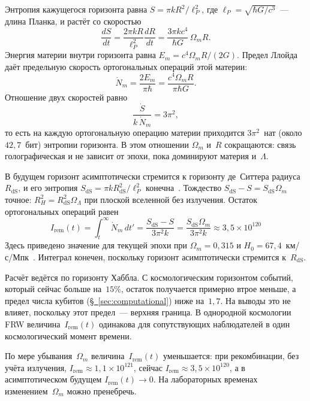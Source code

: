 \documentclass[11pt,a4paper]{article}
\newcommand{\Ost}{I_{\mathrm{rem}}}
\begin{document}
Энтропия кажущегося горизонта равна $S=\pi k R^2/\ell_P^2$, где $\ell_P=\sqrt{\hbar G/c^3}$~--- длина Планка, и растёт со скоростью
\begin{equation}
\frac{dS}{dt}
= \frac{2\pi k R}{\ell_P^2}\frac{dR}{dt}
= \frac{3\pi k c^4}{\hbar G}\,\Omega_m R.
\end{equation}
Энергия материи внутри горизонта равна $E_m=c^4\Omega_m R/(2G)$. Предел Ллойда~\cite{lloyd2000,lloyd2002} даёт предельную скорость ортогональных операций этой материи:
\begin{equation}
\dot N_m = \frac{2E_m}{\pi\hbar} = \frac{c^4\Omega_m R}{\pi\hbar G}.
\end{equation}
Отношение двух скоростей равно
\begin{equation}
\frac{\dot S}{k\,\dot N_m} = 3\pi^2,
\end{equation}
то есть на каждую ортогональную операцию материи приходится $3\pi^2$~нат (около $42{,}7$~бит) энтропии горизонта. В этом отношении $\Omega_m$ и~$R$ сокращаются: связь голографическая и не зависит от эпохи, пока доминируют материя и~$\Lambda$.

В будущем горизонт асимптотически стремится к горизонту де~Ситтера радиуса~$R_{\mathrm{dS}}$, и его энтропия $S_{\mathrm{dS}}=\pi k R_{\mathrm{dS}}^2/\ell_P^2$ конечна~\cite{gibbonshawking1977}. Тождество $S_{\mathrm{dS}}-S=S_{\mathrm{dS}}\Omega_m$ точное: $R_H^2=R_{\mathrm{dS}}^2\Omega_\Lambda$ при плоской вселенной без излучения. Остаток ортогональных операций равен
\begin{equation}
\Ost(t)
= \int_t^\infty \dot N_m\,dt'
= \frac{S_{\mathrm{dS}}-S}{3\pi^2 k}
= \frac{S_{\mathrm{dS}}\Omega_m}{3\pi^2 k}
\approx 3{,}5\times 10^{120}
\end{equation}
Здесь приведено значение для текущей эпохи при $\Omega_m=0{,}315$ и $H_0=67{,}4$~км/с/Мпк~\cite{planck2020}. Интеграл конечен, поскольку горизонт асимптотически стремится к~$R_{\mathrm{dS}}$.

Расчёт ведётся по горизонту Хаббла. С космологическим горизонтом событий, который сейчас больше на~$15\%$, остаток получается примерно втрое меньше, а предел числа кубитов (\hyperref[sec:computational]{\S~\ref*{sec:computational}}) ниже на~$1{,}7$. На выводы это не влияет, поскольку этот предел~--- верхняя граница. В однородной космологии FRW величина~$\Ost(t)$ одинакова для сопутствующих наблюдателей в один космологический момент времени.

По мере убывания~$\Omega_m$ величина~$\Ost(t)$ уменьшается: при рекомбинации, без учёта излучения, $\Ost\approx 1{,}1\times 10^{121}$, сейчас $\Ost\approx 3{,}5\times 10^{120}$, а в асимптотическом будущем $\Ost(t)\to 0$. На лабораторных временах изменением~$\Omega_m$ можно пренебречь.
\end{document}
